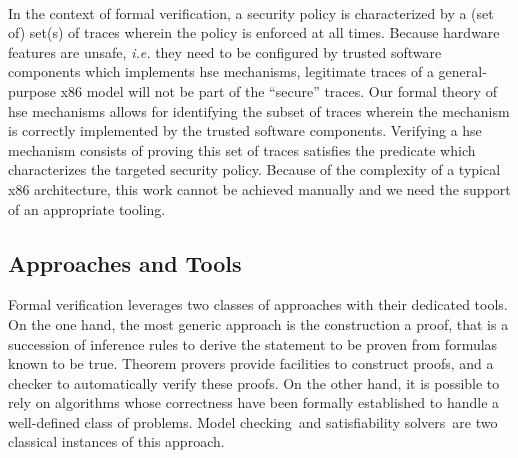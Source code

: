
\paragraph*{}
%
In the context of formal verification, a security policy is characterized by a
(set of) set(s) of traces wherein the policy is enforced at all times.
%
Because hardware features are unsafe, \emph{i.e.} they need to be configured by
trusted software components which implements \ac{hse} mechanisms, legitimate
traces of a general-purpose x86 model will not be part of the ``secure'' traces.
%
Our formal theory of \ac{hse} mechanisms allows for identifying the subset
of traces wherein the mechanism is correctly implemented by the trusted software
components. Verifying a \ac{hse} mechanism consists of proving this set of
traces satisfies the predicate which characterizes the targeted security policy.
%
Because of the complexity of a typical x86 architecture, this work cannot be
achieved manually and we need the support of an appropriate tooling.

\subsection{Approaches and Tools}
\label{subsec:sota:tools}

%

Formal verification leverages two classes of approaches with their dedicated
tools.
%
On the one hand, the most generic approach is the construction a proof, that is
a succession of inference rules to derive the statement to be proven from
formulas known to be true.
%
Theorem provers provide facilities to construct proofs, and a checker to
automatically verify these proofs.
%
On the other hand, it is possible to rely on algorithms whose correctness have
been formally established to handle a well-defined class of problems.
%
Model checking\,\cite{clarke2018modelc} and satisfiability
solvers\,\cite{gomes2008satisfiability} are two classical instances of this
approach.

